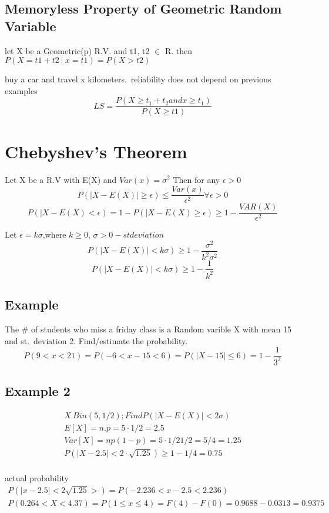 \documentclass[11pt]{article}
\begin{document}
\subsection{Memoryless Property of Geometric Random Variable}
\par let X be a Geometric(p) R.V. and t1, t2 $\in$ R. then $P(X=t1+t2\ |
\ x=t1)=P(X>t2)$
\par buy a car and travel x kilometers.\ reliability does not depend on previous
examples
\begin{equation}
  LS = \frac{P( X \geq t_1 +t_2 and x \ge t_1)}{P(X \ge t1)}
\end{equation}
\section{Chebyshev's Theorem}
\par Let X be a R.V with E(X)  and  $Var(x) = \sigma^2 $ Then for any $\epsilon
> 0 $
\begin{equation}
  P(|X-E(X)| \ge \epsilon ) \le \frac{Var(x)}{\epsilon^2} \forall \epsilon >
  0
\end{equation}
\begin{equation}
  P(|X-E(X)< \epsilon) = 1-P(|X-E(X) \ge \epsilon) \ge
  1-\frac{VAR(X)}{\epsilon^2}
\end{equation}
\par Let $\epsilon = k\sigma$,where $k \ge 0$, $\sigma > 0-st deviation$
\begin{equation}
  P(|X-E(X)|<k\sigma)\ge 1 - \frac{\sigma^2}{k^2\sigma^2}
\end{equation}
\begin{equation}
  P(|X-E(X)|<k\sigma)\ge 1 - \frac{1} {k^2}
\end{equation}
\subsection{Example}
\par The \# of students who miss a friday class is a Random varible X with mean
15 and st.\ deviation 2. Find/estimate the probability.
\begin{equation}
  P(9 < x < 21) = P(-6 < x-15 < 6) = P(|X-15|\le 6) = 1 - \frac{1}{3^2}
\end{equation}
\subsection{Example 2}

\begin{align*}
  X~Bin(5, 1/2) ; Find P(|X-E(X)| < 2 \sigma)\\
  E[X] = n.p = 5 \cdot 1/2 = 2.5\\
  Var[X] = np(1-p) = 5 \cdot 1/2 1/2 = 5/4  = 1.25\\
  P(|X-2.5| < 2\cdot \sqrt{1.25}) \ge 1-1/4 = 0.75 \\
\end{align*}
\par actual probability
\begin{align*}
  P(|x-2.5|< 2\sqrt{1.25}>) = P(-2.236< x-2.5< 2.236)\\
  P(0.264 < X <4.37) = P(1\le x\le 4)= F(4)-F(0) = 0.9688 - 0.0313 = 0.9375
\end{align*}
\end{document}
